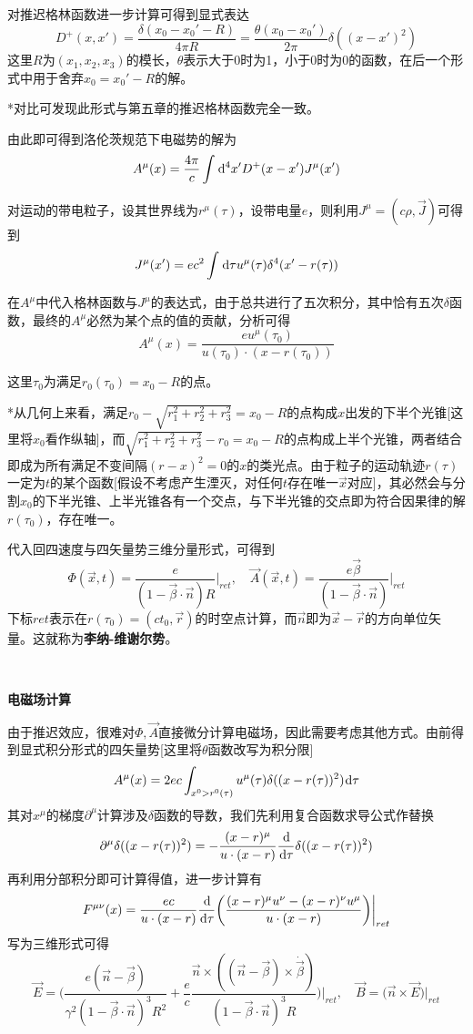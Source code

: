 \documentclass[a4paper,UTF8,fontset=windows]{ctexart}
\newcommand*{\dr}{\hspace{0.07em}\mathrm{d}}
\newcommand*{\va}{\vec{A}}
\newcommand*{\vb}{\vec{B}}
\newcommand*{\ve}{\vec{E}}
\newcommand*{\vj}{\vec{J}}
\newcommand*{\vns}{\vec{n}}
\newcommand*{\vrs}{\vec{r}}
\newcommand*{\vx}{\vec{x}}
\newcommand*{\vbeta}{\vec{\beta}}
\begin{document}
对推迟格林函数进一步计算可得到显式表达
$$D^+(x,x')=\frac{\delta(x_0-x_0'-R)}{4\pi R}=\frac{\theta(x_0-x_0')}{2\pi}\delta((x-x')^2)$$
这里$R$为$(x_1,x_2,x_3)$的模长，$\theta$表示大于0时为1，小于0时为0的函数，在后一个形式中用于舍弃$x_0=x_0'-R$的解。

*对比可发现此形式与第五章的推迟格林函数完全一致。

由此即可得到洛伦茨规范下电磁势的解为
$$A^\mu(x)=\frac{4\pi}{c}\int\dr^4x'D^+(x-x')J^\mu(x')$$

对运动的带电粒子，设其世界线为$r^\mu(\tau)$，设带电量$e$，则利用$J^\mu=(c\rho,\vj)$可得到
$$J^\mu(x')=ec^2\int\dr\tau u^\mu(\tau)\delta^4(x'-r(\tau))$$

在$A^\mu$中代入格林函数与$J^\mu$的表达式，由于总共进行了五次积分，其中恰有五次$\delta$函数，最终的$A^\mu$必然为某个点的值的贡献，分析可得
$$A^\mu(x)=\frac{eu^\mu(\tau_0)}{u(\tau_0)\cdot(x-r(\tau_0))}$$

这里$\tau_0$为满足$r_0(\tau_0)=x_0-R$的点。

*从几何上来看，满足$r_0-\sqrt{r_1^2+r_2^2+r_3^2}=x_0-R$的点构成$x$出发的下半个光锥[这里将$x_0$看作纵轴]，而$\sqrt{r_1^2+r_2^2+r_3^2}-r_0=x_0-R$的点构成上半个光锥，两者结合即成为所有满足不变间隔$(r-x)^2=0$的$x$的类光点。由于粒子的运动轨迹$r(\tau)$一定为$t$的某个函数[假设不考虑产生湮灭，对任何$t$存在唯一$\vx$对应]，其必然会与分割$x_0$的下半光锥、上半光锥各有一个交点，与下半光锥的交点即为符合因果律的解$r(\tau_0)$，存在唯一。

代入回四速度与四矢量势三维分量形式，可得到
$$\Phi(\vx,t)=\frac{e}{(1-\vbeta\cdot\vns)R}\bigg|_{ret},\quad\va(\vx,t)=\frac{e\vbeta}{(1-\vbeta\cdot\vns)}\bigg|_{ret}$$
下标$ret$表示在$r(\tau_0)=(ct_0,\vrs)$的时空点计算，而$\vns$即为$\vx-\vrs$的方向单位矢量。这就称为\textbf{李纳-维谢尔势}。

\

\textbf{电磁场计算}

由于推迟效应，很难对$\Phi,\va$直接微分计算电磁场，因此需要考虑其他方式。由前得到显式积分形式的四矢量势[这里将$\theta$函数改写为积分限]
$$A^\mu(x)=2ec\int_{x^0>r^0(\tau)}u^\mu(\tau)\delta((x-r(\tau))^2)\dr\tau$$
其对$x^\mu$的梯度$\partial^\mu$计算涉及$\delta$函数的导数，我们先利用复合函数求导公式作替换
$$\partial^\mu\delta((x-r(\tau))^2)=-\frac{(x-r)^\mu}{u\cdot(x-r)}\frac{\dr}{\dr\tau}\delta((x-r(\tau))^2)$$
再利用分部积分即可计算得值，进一步计算有
$$F^{\mu\nu}(x)=\frac{ec}{u\cdot(x-r)}\frac{\dr}{\dr\tau}\bigg(\frac{(x-r)^\mu u^\nu-(x-r)^\nu u^\mu}{u\cdot(x-r)}\bigg)\bigg|_{ret}$$
写为三维形式可得
$$\ve=\bigg(\frac{e(\vns-\vbeta)}{\gamma^2(1-\vbeta\cdot\vns)^3R^2}+\frac{e}{c}\frac{\vns\times((\vns-\vbeta)\times\dot{\vbeta})}{(1-\vbeta\cdot\vns)^3R}\bigg)\bigg|_{ret},\quad\vb=\big(\vns\times\ve\big)\big|_{ret}$$
\end{document}
